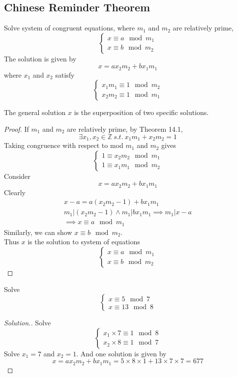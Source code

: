 \documentclass[11pt]{article}
\begin{document}
		\subsection{Chinese Reminder Theorem}
		\begin{theorem}
			Solve system of congruent equations, where $m_1$ and $m_2$ are relatively prime, 
			\[
				\begin{cases}
					x \equiv a \mod m_1 \\
					x \equiv b \mod m_2
				\end{cases}
			\]
			The solution is given by 
			\[
				x = a x_2 m_2 + b x_1 m_1
			\]
			where $x_1$ and $x_2$ satisfy
			\[
				\begin{cases}
					x_1 m_1 \equiv 1 \mod m_2 \\
					x_2 m_2 \equiv 1 \mod m_1 
				\end{cases}
			\]
		\end{theorem}
		The general solution $x$ is the superposition of two specific solutions.
		
		\begin{proof}
			If $m_1$ and $m_2$ are relatively prime, by Theorem 14.1,
			\[
				\exists x_1, x_2 \in \mathbb{Z}\ s.t. \ x_1 m_1 + x_2 m_2 = 1
			\]
			Taking congruence with respect to mod $m_1$ and $m_2$ gives
			\[
				\begin{cases}
					1 \equiv x_2 m_2 \mod m_1 \\
					1 \equiv x_1 m_1 \mod m_2
				\end{cases}
			\]
			Consider 
			\[
				x = a x_2 m_2 + b x_1 m_1
			\]
			Clearly 
			\begin{gather*}
				x - a = a(x_2 m_2 - 1) + b x_1 m_1 \\
				m_1 | (x_2 m_2 - 1) \land m_1 | b x_1 m_1 \implies m_1 | x - a \\
				\implies x \equiv a \mod m_1
			\end{gather*}
			Similarly, we can show $x \equiv b \mod m_2$. \\
			Thus $x$ is the solution to system of equations 
			\[
				\begin{cases}
					x \equiv a \mod m_1 \\
					x \equiv b \mod m_2
				\end{cases}
			\]
		\end{proof}
		
		\begin{example}
			Solve
			\[
				\begin{cases}
					x \equiv 5 \mod 7 \\
					x \equiv 13 \mod 8
				\end{cases}
			\]
		\end{example}
		\begin{proof}[Solution.]
			Solve 
			\[
				\begin{cases}
					x_1 \times 7 \equiv 1 \mod 8 \\
					x_2 \times 8 \equiv 1 \mod 7
				\end{cases}
			\]
			Solve $x_1 = 7$ and $x_2 = 1$. And one solution is given by 
			\[
				x = a x_2 m_2 + b x_1 m_1 = 5 \times 8 \times 1 + 13 \times 7 \times 7 = 677
			\]
		\end{proof}
\end{document}
